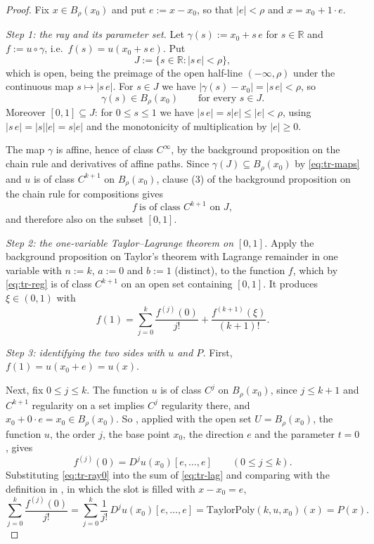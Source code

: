 \begin{proof}
Fix $x\in B_{\rho}(x_0)$ and put $e:=x-x_0$, so that $\lvert e\rvert<\rho$ and
$x=x_0+1\cdot e$.

\medskip\noindent\emph{Step 1: the ray and its parameter set.}
Let $\gamma(s):=x_0+s\,e$ for $s\in\mathbb{R}$ and $f:=u\circ\gamma$, i.e.\
$f(s)=u(x_0+s\,e)$.  Put
\[
  J:=\{s\in\mathbb{R}:\lvert s\,e\rvert<\rho\},
\]
which is open, being the preimage of the open half-line $(-\infty,\rho)$ under the continuous
map $s\mapsto\lvert s\,e\rvert$.  For $s\in J$ we have
$\lvert\gamma(s)-x_0\rvert=\lvert s\,e\rvert<\rho$, so
\begin{equation}\label{eq:tr-maps}
  \gamma(s)\in B_{\rho}(x_0)\qquad\text{for every }s\in J.
\end{equation}
Moreover $[0,1]\subseteq J$: for $0\le s\le1$ we have
$\lvert s\,e\rvert=s\lvert e\rvert\le\lvert e\rvert<\rho$, using
$\lvert s\,e\rvert=\lvert s\rvert\lvert e\rvert=s\lvert e\rvert$ and the monotonicity of
multiplication by $\lvert e\rvert\ge0$.

The map $\gamma$ is affine, hence of class $C^{\infty}$, by the background proposition on the
chain rule and derivatives of affine paths.  Since $\gamma(J)\subseteq B_{\rho}(x_0)$ by
\eqref{eq:tr-maps} and $u$ is of class $C^{k+1}$ on $B_{\rho}(x_0)$, clause (3) of the
background proposition on the chain rule for compositions gives
\begin{equation}\label{eq:tr-reg}
  f\ \text{is of class }C^{k+1}\text{ on }J,
\end{equation}
and therefore also on the subset $[0,1]$.

\medskip\noindent\emph{Step 2: the one-variable Taylor--Lagrange theorem on $[0,1]$.}
Apply the background proposition on Taylor's theorem with Lagrange remainder in one variable
with $n:=k$, $a:=0$ and $b:=1$ (distinct), to the function $f$, which by \eqref{eq:tr-reg} is
of class $C^{k+1}$ on an open set containing $[0,1]$.  It produces $\xi\in(0,1)$ with
\begin{equation}\label{eq:tr-lag}
  f(1)=\sum_{j=0}^{k}\frac{f^{(j)}(0)}{j!}+\frac{f^{(k+1)}(\xi)}{(k+1)!}.
\end{equation}

\medskip\noindent\emph{Step 3: identifying the two sides with $u$ and $P$.}
First, $f(1)=u(x_0+e)=u(x)$.

Next, fix $0\le j\le k$.  The function $u$ is of class $C^{j}$ on $B_{\rho}(x_0)$, since
$j\le k+1$ and $C^{k+1}$ regularity on a set implies $C^{j}$ regularity there, and
$x_0+0\cdot e=x_0\in B_{\rho}(x_0)$.  So \noderef{IteratedDerivAlongRay}, applied with the open
set $U=B_{\rho}(x_0)$, the function $u$, the order $j$, the base point $x_0$, the direction $e$
and the parameter $t=0$, gives
\begin{equation}\label{eq:tr-ray0}
  f^{(j)}(0)=D^{j}u(x_0)[e,\ldots,e]\qquad(0\le j\le k).
\end{equation}
Substituting \eqref{eq:tr-ray0} into the sum of \eqref{eq:tr-lag} and comparing with the
definition in \noderef{TaylorPoly}, in which the slot is filled with $x-x_0=e$,
\[
  \sum_{j=0}^{k}\frac{f^{(j)}(0)}{j!}
  =\sum_{j=0}^{k}\frac{1}{j!}\,D^{j}u(x_0)[e,\ldots,e]
  =\mathrm{TaylorPoly}(k,u,x_0)(x)=P(x).
\]


\end{proof}
